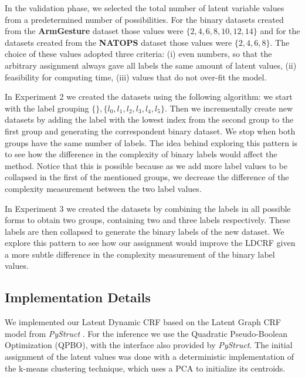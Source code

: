 \documentclass[10pt, conference]{IEEEtran}
\begin{document}
In the validation phase, we selected the total number of latent variable values from a predetermined number of possibilities. For the binary datasets created from the \textbf{ArmGesture} dataset those values were $\{2,4,6,8,10,12,14\}$ and for the datasets created from the \textbf{NATOPS} dataset those values were $\{2,4,6,8\}$.
The choice of these values adopted three criteria: (i) even numbers, so that the arbitrary assignment always gave all labels the same amount of latent values, (ii) feasibility for computing time, (iii) values that do not over-fit the model. 

In Experiment 2 we created the datasets using the following algorithm: we start with the label grouping $\{\}, \{l_0,l_1,l_2,l_3,l_4,l_5\}$.  Then we incrementally create new datasets by adding the label with the lowest index from the second group to the first group and generating the correspondent binary dataset. We stop when both groups have the same number of labels. 
The idea behind exploring this pattern is to see how the difference in the complexity of binary labels would affect the method. Notice that this is possible because as we add more label values to be collapsed in the first of the mentioned groups, we decrease the difference of the complexity measurement between the two label values.

In Experiment 3 we created the datasets by combining the labels in all possible forms to obtain two groups, containing two and three labels respectively. These labels are then collapsed to generate the binary labels of the new dataset. 
We explore this pattern to see how our assignment would improve the LDCRF given a more subtle difference in the  complexity measurement of the binary label values.


\subsection{Implementation Details}

We implemented our Latent Dynamic CRF based on the Latent Graph CRF model from \textit{PyStruct} \cite{pystruct}. For the inference we use the Quadratic Pseudo-Boolean Optimization (QPBO), with the interface also provided by \textit{PyStruct}. The initial assignment of the latent values was done with a deterministic implementation of the k-means clustering technique, which uses a PCA to initialize its centroids. 
\end{document}
